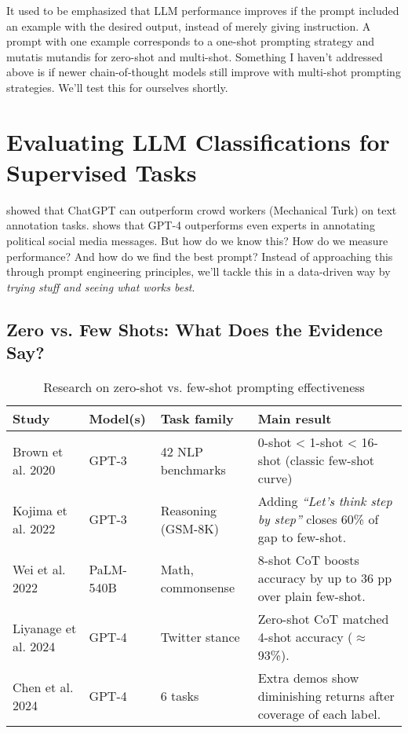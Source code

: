It used to be emphasized that LLM performance improves if the prompt included an example with the desired output, instead of merely giving instruction. A prompt with one example corresponds to a one-shot prompting strategy and mutatis mutandis for zero-shot and multi-shot. Something I haven't addressed above is if newer chain-of-thought models still improve with multi-shot prompting strategies. We'll test this for ourselves shortly.

\section{Evaluating LLM Classifications for Supervised Tasks}

\cite{gilardi2023chatgpt} showed that ChatGPT can outperform crowd workers (Mechanical Turk) on text annotation tasks. \cite{tornberg2024large} shows that GPT-4 outperforms even experts in annotating political social media messages. But how do we know this? How do we measure performance? And how do we find the best prompt? Instead of approaching this through prompt engineering principles, we'll tackle this in a data-driven way by \textit{trying stuff and seeing what works best}.

\subsection{Zero vs. Few Shots: What Does the Evidence Say?}

\begin{table}[H]
\centering
\begin{tabular}{|l|l|l|l|}
\hline
\textbf{Study} & \textbf{Model(s)} & \textbf{Task family} & \textbf{Main result} \\
\hline
Brown et al. 2020 & GPT-3 & 42 NLP benchmarks & 0-shot < 1-shot < 16-shot (classic few-shot curve) \\
\hline
Kojima et al. 2022 & GPT-3 & Reasoning (GSM-8K) & Adding \textit{``Let's think step by step''} closes 60\% of gap to few-shot. \\
\hline
Wei et al. 2022 & PaLM-540B & Math, commonsense & 8-shot CoT boosts accuracy by up to 36 pp over plain few-shot. \\
\hline
Liyanage et al. 2024 & GPT-4 & Twitter stance & Zero-shot CoT matched 4-shot accuracy ($\approx$ 93\%). \\
\hline
Chen et al. 2024 & GPT-4 & 6 tasks & Extra demos show diminishing returns after coverage of each label. \\
\hline
\end{tabular}
\caption{Research on zero-shot vs. few-shot prompting effectiveness}
\end{table}

